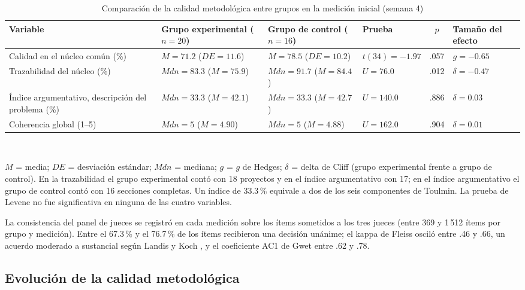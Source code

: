 \documentclass[journal]{IEEEtran}
\begin{document}
\begin{table}[!t]
\caption{Comparación de la calidad metodológica entre grupos en la medición inicial (semana 4)}
\label{tab:baseline}
\centering
\footnotesize
\begin{tabular}{L{4.2cm}L{3.1cm}L{3.1cm}L{2.2cm}cL{1.9cm}}
\toprule
Variable & Grupo experimental ($n = 20$) & Grupo de control ($n = 16$) & Prueba & $p$ & Tamaño del efecto \\
\midrule
Calidad en el núcleo común (\%) & $M = 71.2$ ($DE = 11.6$) & $M = 78.5$ ($DE = 10.2$) & $t(34) = -1.97$ & .057 & $g = -0.65$ \\
Trazabilidad del núcleo (\%) & $Mdn = 83.3$ ($M = 75.9$) & $Mdn = 91.7$ ($M = 84.4$) & $U = 76.0$ & .012 & $\delta = -0.47$ \\
Índice argumentativo, descripción del problema (\%) & $Mdn = 33.3$ ($M = 42.1$) & $Mdn = 33.3$ ($M = 42.7$) & $U = 140.0$ & .886 & $\delta = 0.03$ \\
Coherencia global (1--5) & $Mdn = 5$ ($M = 4.90$) & $Mdn = 5$ ($M = 4.88$) & $U = 162.0$ & .904 & $\delta = 0.01$ \\
\bottomrule
\end{tabular}
\\[2pt]
\parbox{0.92\textwidth}{\raggedright\scriptsize $M$ = media; $DE$ = desviación estándar; $Mdn$ = mediana; $g$ = $g$ de Hedges; $\delta$ = delta de Cliff (grupo experimental frente a grupo de control). En la trazabilidad el grupo experimental contó con 18 proyectos y en el índice argumentativo con 17; en el índice argumentativo el grupo de control contó con 16 secciones completas. Un índice de 33.3\,\% equivale a dos de los seis componentes de Toulmin. La prueba de Levene no fue significativa en ninguna de las cuatro variables.}
\end{table}

La consistencia del panel de jueces se registró en cada medición sobre los ítems sometidos a los tres jueces (entre 369 y 1\,512 ítems por grupo y medición). Entre el 67.3\,\% y el 76.7\,\% de los ítems recibieron una decisión unánime; el kappa de Fleiss osciló entre .46 y .66, un acuerdo moderado a sustancial según Landis y Koch \cite{landis1977}, y el coeficiente AC1 de Gwet entre .62 y .78.

\subsection{Evolución de la calidad metodológica}
\end{document}
